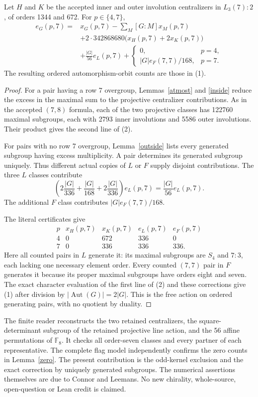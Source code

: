 \documentclass[11pt,a4paper]{article}
\begin{document}
\begin{theorem}
Let $H$ and $K$ be the accepted inner and outer involution centralizers
in $L_3(7):2$, of orders 1344 and 672. For $p\in\{4,7\}$,
\begin{align*}
 e_G(p,7)={}&x_G(p,7)-\sum_M[G:M]x_M(p,7)\\
 &+2\cdot342868680\bigl(x_H(p,7)+2x_K(p,7)\bigr)\\
 &+\frac{|G|}{56}e_L(p,7)
       +\begin{cases}0,&p=4,\\ |G|e_F(7,7)/168,&p=7.\end{cases}       \tag{2}
\end{align*}
The resulting ordered automorphism-orbit counts are those in (1).
\end{theorem}
\begin{proof}
For a pair having a row 7 overgroup, Lemmas~\ref{atmost} and
\ref{inside} reduce the excess in the maximal sum to the projective
centralizer contributions. As in the accepted $(7,8)$ formula,
each of the two projective classes has 122760 maximal subgroups,
each with 2793 inner involutions and 5586 outer involutions.
Their product gives the second line of (2).

For pairs with no row 7 overgroup, Lemma~\ref{outside} lists every
generated subgroup having excess multiplicity. A pair determines
its generated subgroup uniquely. Thus different actual copies of
$L$ or $F$ supply disjoint contributions. The three $L$ classes
contribute
\[
 \left(2\frac{|G|}{336}+\frac{|G|}{168}
                  +2\frac{|G|}{336}\right)e_L(p,7)
                       =\frac{|G|}{56}e_L(p,7).
\]
The additional $F$ class contributes $|G|e_F(7,7)/168$.

The literal certificates give
\[
\begin{array}{c|rrrr}
p&x_H(p,7)&x_K(p,7)&e_L(p,7)&e_F(p,7)\\\hline
4&0&672&336&0\\
7&0&336&336&336.
\end{array}
\]
Here all counted pairs in $L$ generate it: its maximal subgroups
are $S_4$ and $7:3$, each lacking one necessary element order.
Every counted $(7,7)$ pair in $F$ generates it because its proper
maximal subgroups have orders eight and seven. The exact character
evaluation of the first line of (2) and these corrections give (1)
after division by $|\operatorname{Aut}(G)|=2|G|$. This is the free
action on ordered generating pairs, with no quotient by duality.
\end{proof}

The finite reader reconstructs the two retained centralizers, the
square-determinant subgroup of the retained projective line action,
and the 56 affine permutations of $\mathbb F_8$. It checks all
order-seven classes and every partner of each representative.
The complete flag model independently confirms the zero counts
in Lemma~\ref{zero}. The present contribution is the odd-kernel
exclusion and the exact correction by uniquely generated subgroups.
The numerical assertions themselves are due to Connor and Leemans.
No new chirality, whole-source, open-question or Lean credit is claimed.
\end{document}
